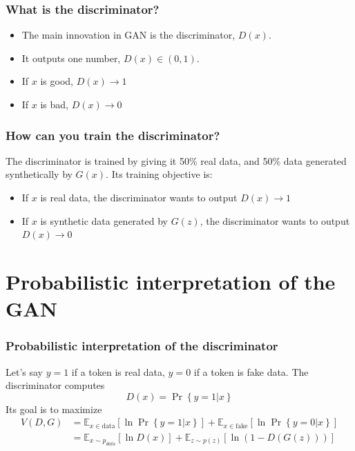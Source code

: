 \documentclass{beamer}
\begin{document}
\begin{frame}
  \frametitle{What is the discriminator?}

  \begin{itemize}
  \item The main innovation in GAN is the discriminator, $D(x)$.
  \item It outputs one number, $D(x)\in (0,1)$.
  \item If $x$ is good, $D(x)\rightarrow 1$
  \item If $x$ is bad, $D(x)\rightarrow 0$
  \end{itemize}
\end{frame}
  
\begin{frame}
  \frametitle{How can you train the discriminator?}

  The discriminator is trained by giving it 50\% real data, and
  50\% data generated synthetically by $G(x)$. Its training objective is:
  \begin{itemize}
  \item If $x$ is real data, the discriminator wants to output $D(x)\rightarrow 1$
  \item If $x$ is synthetic data generated by $G(z)$, the
    discriminator wants to output $D(x)\rightarrow 0$
  \end{itemize}
\end{frame}
  
\section[Probabilities]{Probabilistic interpretation of the GAN}
\setcounter{subsection}{1}

\begin{frame}
  \frametitle{Probabilistic interpretation of the discriminator}

  Let's say $y=1$ if a token is real data, $y=0$ if a token is fake data.
  The discriminator computes
  \begin{displaymath}
    D(x) = \Pr\left\{y=1|x\right\}
  \end{displaymath}
  Its goal is to maximize
  \begin{align*}
    V(D,G) 
    &= \mathbb{E}_{x\in\mbox{data}}\left[\ln \Pr\left\{y=1|x\right\}\right]
    +\mathbb{E}_{x\in\mbox{fake}}\left[\ln\Pr\left\{y=0|x\right\}\right]\\
    &= \mathbb{E}_{x\sim p_{data}}\left[\ln D(x)\right]
    +\mathbb{E}_{z\sim p(z)}\left[\ln\left(1-D(G(z))\right)\right]
  \end{align*}
\end{frame}
\end{document}
